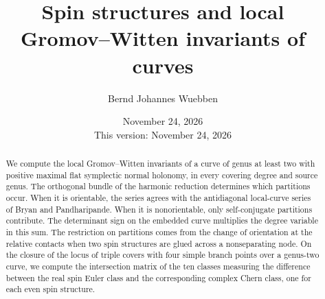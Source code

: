 \documentclass[11pt]{amsart}
\title[Spin structures and local curve invariants]{Spin structures and local\\ Gromov--Witten invariants of curves}
\author{Bernd Johannes Wuebben}
\date{November 24, 2026\\This version: November 24, 2026}
\theoremstyle{definition}
\theoremstyle{remark}
\begin{document}
\begin{abstract}
We compute the local Gromov--Witten invariants of a curve of genus at least two with positive maximal flat symplectic normal holonomy, in every covering degree and source genus. The orthogonal bundle of the harmonic reduction determines which partitions occur. When it is orientable, the series agrees with the antidiagonal local-curve series of Bryan and Pandharipande. When it is nonorientable, only self-conjugate partitions contribute. The determinant sign on the embedded curve multiplies the degree variable in this sum. The restriction on partitions comes from the change of orientation at the relative contacts when two spin structures are glued across a nonseparating node. On the closure of the locus of triple covers with four simple branch points over a genus-two curve, we compute the intersection matrix of the ten classes measuring the difference between the real spin Euler class and the corresponding complex Chern class, one for each even spin structure.
\end{abstract}
\maketitle









\end{document}
